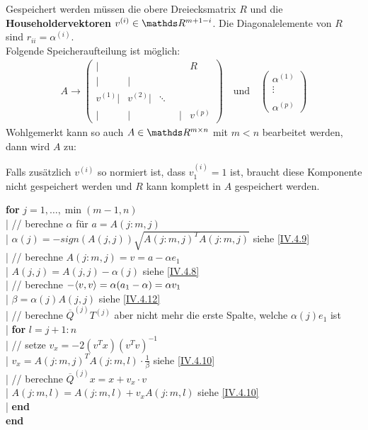 Gespeichert werden müssen die obere Dreiecksmatrix $R$ und die 
\textbf{Householdervektoren} 
$v^{(i)}\in \R^{m+1-i}$.
Die Diagonalelemente von $R$ sind $r_{ii} = \alpha^{(i)}$. \\
Folgende Speicheraufteilung ist möglich:
\begin{gather*}
  A \longrightarrow \left(
    \begin{array}{rrrrr}
      |&&& R \\
      |&| \\
      v^{(1)}| & v^{(2)}|&\ddots ~~\\
      | &|&\phantom{v^{(i)}}|& v^{(p)}			
    \end{array}
  \right)
  \quad \text{und} \quad 
  \begin{pmatrix}
    \alpha^{(1)} \\ \vdots \\ \\ \alpha^{(p)}
  \end{pmatrix}
\end{gather*}
Wohlgemerkt kann so auch $A\in \R^{m\times n}$ mit $m<n$ bearbeitet werden,
dann wird $A$ zu:

\label{im4.4.5}

Falls zusätzlich $v^{(i)}$ so normiert ist,
dass $v_1^{(i)} = 1$ ist, braucht diese Komponente nicht gespeichert werden 
und $R$ kann komplett in $A$ gespeichert werden.



\begin{pseudocode}{\linewidth}
  \textbf{for} $j = 1,\dots, \min(m - 1, n)$ \\
  |	\>	// berechne $\alpha$ für $a = A(j : m, j)$ \\
  |	\>	$\alpha(j) = -sign(A(j, j))\sqrt{A(j:m, j)^T A(j:m, j)}$ \>\>\>\> siehe \eqref{IV.4.9}\\
  |	\>  // berechne $A(j:m,j)=v=a-\alpha e_1$ \\
  |	\>	$A(j,j)=A(j,j)-\alpha(j)$ \>\>\>\> siehe \eqref{IV.4.8}\\
  |	\> // berechne $-\langle v, v \rangle = \alpha(a_1 - \alpha) = \alpha v_1$ \\
  |	\> $\beta = \alpha(j)A(j, j)$\>\>\>\> siehe \eqref{IV.4.12}\\
  |	\> // berechne $\overline{Q}^{(j)}T^{(j)}$ 
  aber nicht mehr die erste Spalte, welche $\alpha(j)e_1$ ist\\
  |	\> \textbf{for} $l = j + 1 : n$\\
  |		\>\> // setze $v_x = -2{(v^Tx)}{(v^Tv)}^{-1}$\\
  |		\>\> $v_x = A(j : m, j)^TA(j:m,l)\cdot \frac{1}{\beta}$ \>\>\>siehe \eqref{IV.4.10}\\
  |		\>\> // berechne  $\overline{Q}^{(j)}x=x+v_x\cdot v$\\
  |		\>\> $A(j:m,l) = A(j:m,l)+v_xA(j:m,l)$ \>\>\> siehe \eqref{IV.4.10}\\
  |	\>\textbf{end}\\
  \textbf{end}
\end{pseudocode}


